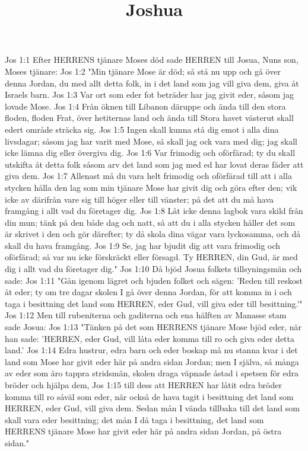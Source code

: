 

\title{Joshua}

Jos 1:1  Efter HERRENS tjänare Moses död sade HERREN till Josua, Nuns son, Moses tjänare:
Jos 1:2  "Min tjänare Mose är död; så stå nu upp och gå över denna Jordan, du med allt detta folk, in i det land som jag vill giva dem, giva åt Israels barn.
Jos 1:3  Var ort som eder fot beträder har jag givit eder, såsom jag lovade Mose.
Jos 1:4  Från öknen till Libanon däruppe och ända till den stora floden, floden Frat, över hetiternas land och ända till Stora havet västerut skall edert område sträcka sig.
Jos 1:5  Ingen skall kunna stå dig emot i alla dina livsdagar; såsom jag har varit med Mose, så skall jag ock vara med dig; jag skall icke lämna dig eller övergiva dig.
Jos 1:6  Var frimodig och oförfärad; ty du skall utskifta åt detta folk såsom arv det land som jag med ed har lovat deras fäder att giva dem.
Jos 1:7  Allenast må du vara helt frimodig och oförfärad till att i alla stycken hålla den lag som min tjänare Mose har givit dig och göra efter den; vik icke av därifrån vare sig till höger eller till vänster; på det att du må hava framgång i allt vad du företager dig.
Jos 1:8  Låt icke denna lagbok vara skild från din mun; tänk på den både dag och natt, så att du i alla stycken håller det som är skrivet i den och gör därefter; ty då skola dina vägar vara lyckosamma, och då skall du hava framgång.
Jos 1:9  Se, jag har bjudit dig att vara frimodig och oförfärad; så var nu icke förskräckt eller försagd. Ty HERREN, din Gud, är med dig i allt vad du företager dig."
Jos 1:10  Då bjöd Josua folkets tillsyningsmän och sade:
Jos 1:11  "Gån igenom lägret och bjuden folket och sägen: 'Reden till reskost åt eder; ty om tre dagar skolen I gå över denna Jordan, för att komma in i och taga i besittning det land som HERREN, eder Gud, vill giva eder till besittning.'"
Jos 1:12  Men till rubeniterna och gaditerna och ena hälften av Manasse stam sade Josua:
Jos 1:13  "Tänken på det som HERRENS tjänare Mose bjöd eder, när han sade: 'HERREN, eder Gud, vill låta eder komma till ro och giva eder detta land.'
Jos 1:14  Edra hustrur, edra barn och eder boskap må nu stanna kvar i det land som Mose har givit eder här på andra sidan Jordan; men I själva, så många av eder som äro tappra stridsmän, skolen draga väpnade åstad i spetsen för edra bröder och hjälpa dem,
Jos 1:15  till dess att HERREN har låtit edra bröder komma till ro såväl som eder, när också de hava tagit i besittning det land som HERREN, eder Gud, vill giva dem. Sedan mån I vända tillbaka till det land som skall vara eder besittning; det mån I då taga i besittning, det land som HERRENS tjänare Mose har givit eder här på andra sidan Jordan, på östra sidan."
